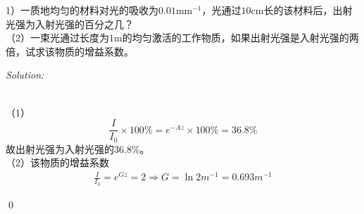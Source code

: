 \documentclass[12pt,a4paper]{article}
\newenvironment{problem}[2][Problem]{\begin{trivlist}
\item[\hskip \labelsep {\bfseries #1}\hskip \labelsep {\bfseries #2.}]}{\end{trivlist}}
\newenvironment{sol}
    {\emph{Solution:}
    }
    {
    \qed
    }
\begin{document}
\begin{problem}{1.13}
（1）一质地均匀的材料对光的吸收为$0.01\text{mm}^{-1}$，光通过$10$cm长的该材料后，出射光强为入射光强的百分之几？\\
（2）一束光通过长度为$1$m的均匀激活的工作物质，如果出射光强是入射光强的两倍，试求该物质的增益系数。
\end{problem}
\begin{sol}
\\（1）
\begin{equation}
\frac{I}{I_0}\times100\%=e^{-Az}\times100\%=36.8\%
\end{equation}
故出射光强为入射光强的$36.8\%$。\\
（2）该物质的增益系数
\begin{gather}
\frac{I}{I_0}=e^{Gz}=2\Longrightarrow G=\ln2m^{-1}=0.693m^{-1}
\end{gather}
\end{sol}
\end{document}
